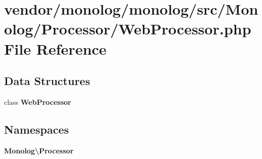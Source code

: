 \section{vendor/monolog/monolog/src/\+Monolog/\+Processor/\+Web\+Processor.php File Reference}
\label{_web_processor_8php}
\subsection*{Data Structures}
\begin{DoxyCompactItemize}
\item 
class {\bf Web\+Processor}
\end{DoxyCompactItemize}
\subsection*{Namespaces}
\begin{DoxyCompactItemize}
\item 
 {\bf Monolog\textbackslash{}\+Processor}
\end{DoxyCompactItemize}
